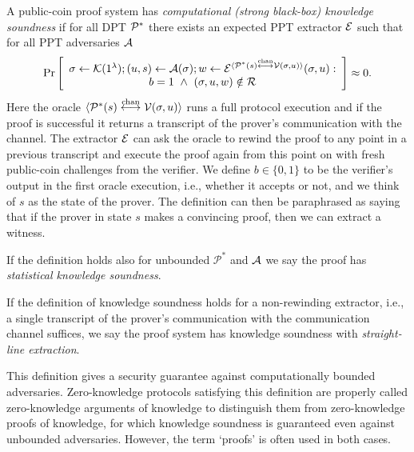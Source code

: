 \begin{definition}
A public-coin proof system has \emph{computational (strong black-box) knowledge soundness} if for all DPT $\mathcal{P}^*$ there exists an expected PPT extractor $\mathcal{E}$ such that for all PPT adversaries $\mathcal{A}$
$$\Pr\left[\begin{array}{c} \mathsf{\sigma}\gets \mathcal{K}(1^{\lambda});(u,s) \gets \mathcal{A}(\mathsf{\sigma}); w\gets \mathcal{E}^{\langle \mathcal{P}^*(s)\overset{\textnormal{chan}}{\longleftrightarrow}\mathcal{V}(\mathsf{\sigma},u)\rangle}(\mathsf{\sigma},u):\\ b=1 ~\wedge~ (\mathsf{\sigma},u,w)\notin \mathcal{R} \end{array}\right]\approx 0.$$ 
Here the oracle $\langle \mathcal{P}^*(s)\overset{\textnormal{chan}}{\longleftrightarrow}\mathcal{V}(\mathsf{\sigma},u)\rangle$ runs a full protocol execution and if the proof is successful it returns a transcript of the prover's communication with the channel. The extractor $\mathcal{E}$ can ask the oracle to rewind the proof to any point in a previous transcript and execute the proof again from this point on with fresh public-coin challenges from the verifier. We define $b\in \{0,1\}$ to be the verifier's output in the first oracle execution, i.e., whether it accepts or not, and we think of $s$ as the state of the prover. The definition can then be paraphrased as saying that if the prover in state $s$ makes a convincing proof, then we can extract a witness.

If the definition holds also for unbounded $\mathcal{P}^*$ and $\mathcal{A}$ we say the proof has {\em statistical knowledge soundness}. 

If the definition of knowledge soundness holds for a non-rewinding extractor, i.e., a single transcript of the prover's communication with the communication channel suffices, we say the proof system has knowledge soundness with {\em straight-line extraction}. 
\end{definition}
\noindent
This definition gives a security guarantee against computationally bounded adversaries. Zero-knowledge protocols satisfying this definition are properly called zero-knowledge arguments of knowledge to distinguish them from zero-knowledge proofs of knowledge, for which knowledge soundness is guaranteed even against unbounded adversaries. However, the term `proofs' is often used in both cases.

